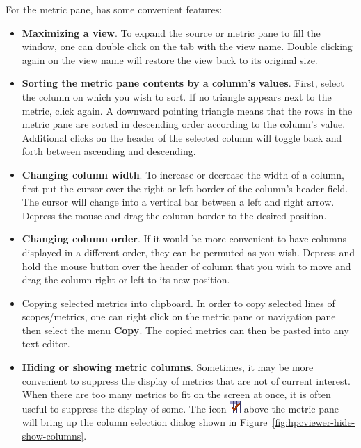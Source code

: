 For the metric pane, \hpcviewer{} has some convenient features:
\begin{itemize}

\item \textbf{Maximizing a view}. To expand the source or metric pane to fill the window, one can double click on the tab with the view name. Double clicking again on the view name will restore the view back to its original size.

\item \textbf{Sorting the metric pane contents by a column's values}. First, select the column on which you wish to sort. If no triangle appears next to the metric, click again. A downward pointing triangle means that the rows in the metric pane are sorted in descending order according to the column's value. Additional clicks on the header of the selected column will toggle back and forth between ascending and descending.

\item \textbf{Changing column width}. To increase or decrease the width of a column, first put the cursor over the right or left border of the column's header field. The cursor will change into a vertical bar between a left and right arrow. Depress the mouse and drag the column border to the desired position.

\item \textbf{Changing column order}. If it would be more convenient to have columns displayed in a different order, they can be permuted as you wish. Depress and hold the mouse button over the header of column that you wish to move and drag the column right or left to its new position.

\item Copying selected metrics into clipboard.
In order to copy selected lines of scopes/metrics, one can right click on the metric pane or navigation pane then select the menu \textbf{Copy}.
The copied metrics can then be pasted into any text editor.

\item \textbf{Hiding or showing metric columns}.
Sometimes, it may be more convenient to suppress the display of metrics that are not of current interest.
When there are too many metrics to fit on the screen at once, it is often useful to suppress the display of some.
The icon \includegraphics[scale=.7]{fig/checkColumns.png} above the metric pane will bring up the column selection dialog shown in Figure~\ref{fig:hpcviewer-hide-show-columns}.


\end{itemize}
